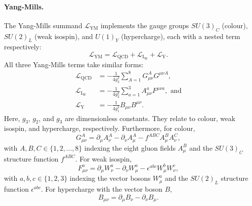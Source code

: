 \paragraph{Yang-Mills.}
The Yang-Mills summand $\mathcal{L}_\mathrm{YM}$ implements the gauge groups
$SU\!(3)_C$ (colour), $SU\!(2)_L$ (weak isospin), and $U\!(1)_Y$ (hypercharge),
each with a nested term respectively:
\begin{equation}
\label{eqn:theory_sm_lagrangian_top_ym}
\mathcal{L}_\mathrm{YM} =
\mathcal{L}_\mathrm{QCD}
+ \mathcal{L}_\mathrm{I_W}
+ \mathcal{L}_\mathrm{Y}
.
\end{equation}
All three Yang-Mills terms take similar forms:
\begin{align}
\label{eqn:theory_sm_lagrangian_top_ym_terms}
\mathcal{L}_\mathrm{QCD} &=
-\frac{1}{4g^2_3}
\sum_{A=1}^8 G^A_{\mu\nu} G^{\mu\nu A}
,\\
\mathcal{L}_\mathrm{I_W} &=
-\frac{1}{4g^2_2}
\sum_{a=1}^3 A^a_{\mu\nu} F^{\mu\nu a}
,\textrm{ and}\\
\mathcal{L}_\mathrm{Y} &=
-\frac{1}{4g^2_1} B_{\mu\nu} B^{\mu\nu}
.
\end{align}
Here, $g_3$, $g_2$, and $g_3$ are dimensionless constants.
They relate to colour, weak isospin, and hypercharge, respectively.
Furthermore, for colour,
\begin{equation}
G^A_{\mu\nu} =
\partial_\mu A^A_\nu - \partial_\nu A^A_\mu - f^{ABC} A^B_\mu A^C_\nu
,
\end{equation}
with $A, B, C \in \{1, 2, ..., 8\}$ indexing the eight gluon fields $A^B_\mu$ and
the $SU\!(3)_C$ structure function $f^{ABC}$.
For weak isospin,
\begin{equation}
F^a_{\mu\nu} =
\partial_\mu W^a_\nu - \partial_\nu W^a_\mu - \epsilon^{abc} W^b_\mu W^c_\nu
,
\end{equation}
with $a, b, c \in \{1, 2, 3\}$ indexing the vector bosons $W^a_\mu$ and
the $SU\!(2)_L$ structure function $\epsilon^{abc}$.
For hypercharge with the vector boson $B$,
\begin{equation}
B_{\mu\nu} =
\partial_\mu B_\nu - \partial_\nu B_\mu
.
\end{equation}

